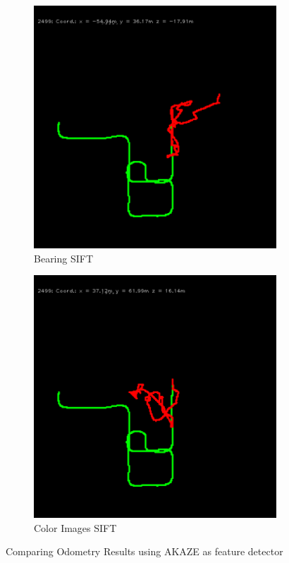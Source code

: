 \begin{figure}[H]
\begin{subfigure}[c]{0.31\linewidth}
    \includegraphics[width=\linewidth]{chapter06/odo/jonas_bearing_SIFT.png}%
    \caption{Bearing SIFT}
\end{subfigure}%
\begin{subfigure}[c]{0.31\linewidth}
    \includegraphics[width=\linewidth]{chapter06/odo/zhang_pinhole_SIFT.png}%
    \caption{Color Images SIFT}
\end{subfigure}
\caption{Comparing Odometry Results using AKAZE as feature detector}
\end{figure}

